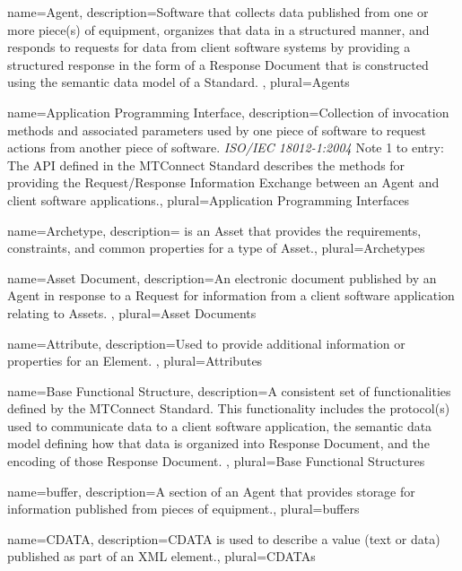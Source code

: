 {
    name={Agent},
	description={Software that collects data published from one or more piece(s) of equipment, organizes that data in a structured manner, and responds to requests for data from client software systems by providing a structured response in the form of a \gls{Response Document} that is constructed using the \gls{semantic data model} of a Standard. 
},
	plural={Agents}
}

{
    name={Application Programming Interface},
	description={Collection of invocation methods and associated parameters used by one piece of software to request actions from another piece of software. \textit{ISO/IEC 18012-1:2004}
\newline Note 1 to entry: The API defined in the MTConnect Standard describes the methods for providing the \gls{Request/Response} Information Exchange between an \gls{Agent} and client software applications.},
	plural={Application Programming Interfaces}
}

{
    name={Archetype},
	description={ is an \gls{Asset} that provides the requirements, constraints, and common properties for a type of \gls{Asset}.},
	plural={Archetypes}
}

{
    name={Asset Document},
	description={An electronic document published by an \gls{Agent} in response to a \gls{Request} for information from a client software application relating to Assets.
},
	plural={Asset Documents}
}

{
    name={Attribute},
	description={Used to provide additional information or properties for an \gls{Element}.
},
	plural={Attributes}
}

{
    name={Base Functional Structure},
	description={A consistent set of functionalities defined by the MTConnect Standard. This functionality includes the protocol(s) used to communicate data to a client software application, the \gls{semantic data model} defining how that data is organized into \gls{Response Document}, and the encoding of those \gls{Response Document}.
},
	plural={Base Functional Structures}
}

{
    name={buffer},
	description={A section of an \gls{Agent} that provides storage for information published from pieces of equipment.},
	plural={buffers}
}

{
    name={CDATA},
	description={\gls{CDATA} is used to describe a value (text or data) published as part of an XML element.},
	plural={CDATAs}
}

